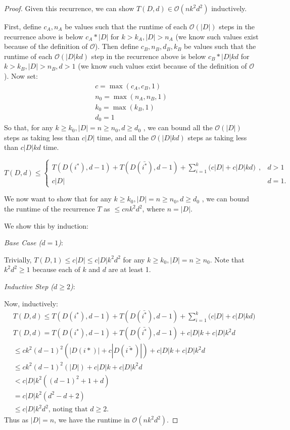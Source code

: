 \begin{proof}
Given this recurrence, we can show $T(D, d) \in \mathcal{O}(nk^2d^2)$ inductively. 

First, define $c_A, n_A$ be values such that the runtime of each $\mathcal{O}(|D|)$ steps in the recurrence above is below $c_A * |D|$ for $k > k_A, |D| > n_A$ (we know such values exist because of the definition of $\mathcal{O}$). Then define $c_B, n_B, d_B, k_B$ be values such that the runtime of each $\mathcal{O}(|D|kd)$ step in the recurrence above is below $c_B * |D|kd$ for $k > k_B, |D| > n_B, d > 1$ (we know such values exist because of the definition of $\mathcal{O}$).
Now set: 
\begin{align*}
    c = \max(c_A, c_B, 1)\\
    n_0 = \max(n_A, n_B, 1)\\
    k_0 = \max(k_B, 1)\\
    d_0 = 1
\end{align*}
So that, for any $k \geq k_0, |D|=n \geq n_0, d \geq d_0$ , we can bound all the $\mathcal{O}(|D|)$ steps as taking less than $c|D|$ time, and all the $\mathcal{O}(|D|kd)$ steps as taking less than $c|D|kd$ time. 

$$T(D, d) \leq \begin{cases}
        T(D(i^*), d-1) + T(D(\bar{i^*}), d-1) + \sum_{i=1}^k \Big(c|D| + c|D|kd \Big) \ \ , & d > 1\\
        c|D| & d=1.
    \end{cases}$$

We now want to show that  for any $k \geq k_0, |D|=n \geq n_0, d \geq d_0$ , we can bound the runtime of the recurrence $T$ as $\leq cnk^2d^2$, where $n = |D|$. 

We show this by induction: 

\textit{Base Case ($d=1$)}: 

Trivially, $T(D, 1) \leq c|D| \leq c |D|k^2d^2$ for any $k \geq k_0, |D|=n \geq n_0$. Note that $k^2d^2 \geq 1$ because each of $k$ and $d$ are at least 1. 

\textit{Inductive Step ($d \geq 2$)}: 

Now, inductively: 
\begin{align}
    &T(D, d) \leq T(D(i^*), d-1) + T(D(\bar{i^*}), d-1) + \sum_{i=1}^k\Big(c|D| + c|D|kd\Big) \\ 
    &T(D, d) = T(D(i^*), d-1) + T(D(\bar{i^*}), d-1) + c|D|k + c|D|k^2d \\ 
&\leq ck^2(d-1)^2(|D(i*)| + c|D(\bar{i*})|) + c|D|k + c|D|k^2d \\ 
&\leq ck^2(d-1)^2(|D|) + c|D|k + c|D|k^2d \\ 
& < c|D|k^2((d-1)^2 + 1 + d )\\ 
& = c|D|k^2(d^2-d+2)\\ 
& \leq c|D|k^2d^2 \textrm{, noting that $d \geq 2$.}
\end{align}
Thus as $|D| = n$, we have the runtime in $\mathcal{O}(nk^2d^2)$.

\end{proof}
